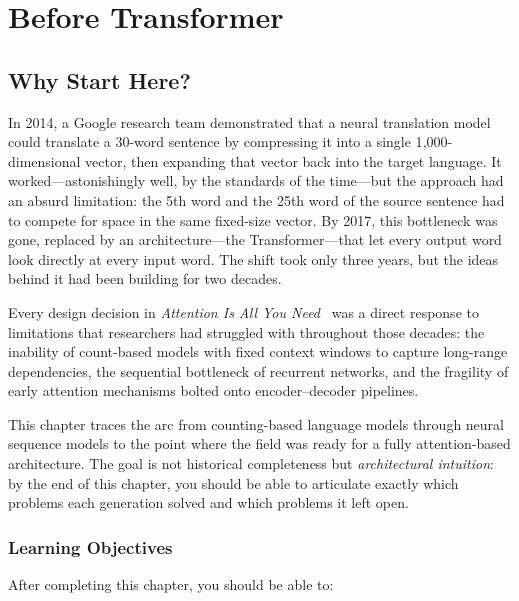 \chapter{Before Transformer}
\label{ch:before-transformer}

\section{Why Start Here?}

In 2014, a Google research team demonstrated that a neural translation model could translate a 30-word sentence by compressing it into a single 1{,}000-dimensional vector, then expanding that vector back into the target language. It worked---astonishingly well, by the standards of the time---but the approach had an absurd limitation: the 5th word and the 25th word of the source sentence had to compete for space in the same fixed-size vector. By 2017, this bottleneck was gone, replaced by an architecture---the Transformer---that let every output word look directly at every input word. The shift took only three years, but the ideas behind it had been building for two decades.

Every design decision in \emph{Attention Is All You Need}~\cite{vaswani2017attention} was a direct response to limitations that researchers had struggled with throughout those decades: the inability of count-based models with fixed context windows to capture long-range dependencies, the sequential bottleneck of recurrent networks, and the fragility of early attention mechanisms bolted onto encoder--decoder pipelines.

This chapter traces the arc from counting-based language models through neural sequence models to the point where the field was ready for a fully attention-based architecture. The goal is not historical completeness but \emph{architectural intuition}: by the end of this chapter, you should be able to articulate exactly which problems each generation solved and which problems it left open.

\subsection*{Learning Objectives}

After completing this chapter, you should be able to:

